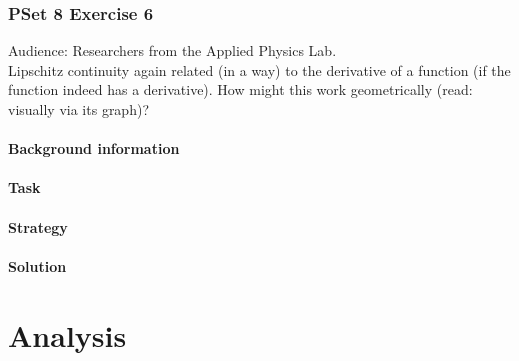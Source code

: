 \documentclass[11 pt]{article}
\begin{document}
\section{PSet 8 Exercise 6}
Audience: Researchers from the Applied Physics Lab.\\
Lipschitz continuity again related (in a way) to the derivative of a function (if the function indeed has a derivative). How might this work geometrically (read: visually via its graph)?
\begin{multicols*}{2} 
\subsection{Background information}
\subsection{Task}
\subsection{Strategy}
\columnbreak
\subsection{Solution}
\end{multicols*}
\pagebreak


\part{Analysis}
\end{document}
